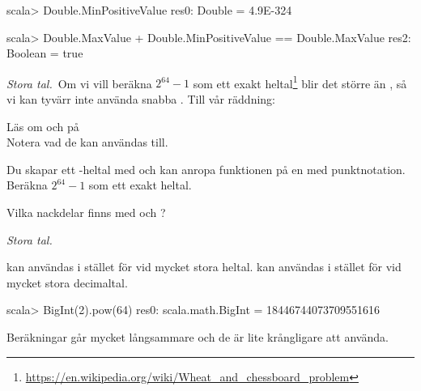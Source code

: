 {\SOLUTION

\TaskSolved \what

\SubtaskSolved 

\begin{REPL}
scala> Double.MinPositiveValue
res0: Double = 4.9E-324
\end{REPL}

\SubtaskSolved 

\begin{REPL}
scala> Double.MaxValue + Double.MinPositiveValue == Double.MaxValue
res2: Boolean = true
\end{REPL}

\QUESTEND


\def\what{\emph{Stora tal.}}

\QUESTBEGIN

\Task \what~Om vi vill beräkna $2^{64} -1$ som ett exakt heltal\footnote{\url{https://en.wikipedia.org/wiki/Wheat_and_chessboard_problem}} blir det större än , så vi kan tyvärr inte använda snabba . Till vår räddning:  

\Subtask Läs om  och  på \Scaladoc \\ Notera vad de kan användas till. 

\Subtask Du skapar ett -heltal med  och kan anropa funktionen  på en  med punktnotation. Beräkna $2^{64} -1$ som ett exakt heltal.

\Subtask Vilka nackdelar finns med  och ?

\SOLUTION

\TaskSolved \what

\SubtaskSolved {} kan användas i stället för  vid mycket stora heltal.  kan användas i stället för  vid mycket stora decimaltal.

\SubtaskSolved 
\begin{REPL}
scala> BigInt(2).pow(64)
res0: scala.math.BigInt = 18446744073709551616
\end{REPL}

\SubtaskSolved Beräkningar går mycket långsammare och de är lite krångligare att använda.

\QUESTEND





\def\what{\emph{QUESTTEMPLATE}}

\QUESTBEGIN

}

